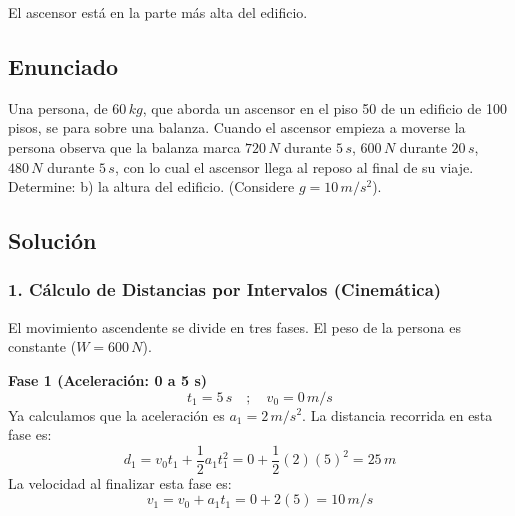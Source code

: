 \documentclass[12pt, a4paper]{article}
\begin{document}
\begin{tcolorbox}[colback=green!5!white, colframe=green!50!black, title=Respuesta Final]
\centering
El ascensor está en la parte más alta del edificio.
\end{tcolorbox}

\newpage

\subsection*{Enunciado}
Una persona, de $60 \, \si{kg}$, que aborda un ascensor en el piso 50 de un edificio de 100 pisos, se para sobre una balanza. Cuando el ascensor empieza a moverse la persona observa que la balanza marca $720 \, \si{N}$ durante $5 \, \si{s}$, $600 \, \si{N}$ durante $20 \, \si{s}$, $480 \, \si{N}$ durante $5 \, \si{s}$, con lo cual el ascensor llega al reposo al final de su viaje. Determine:
b) la altura del edificio. (Considere $g = 10 \, \si{m/s^2}$).

\begin{center}
\end{center}

\subsection*{Solución}

\subsubsection*{1. Cálculo de Distancias por Intervalos (Cinemática)}
El movimiento ascendente se divide en tres fases. El peso de la persona es constante ($W = 600 \, \si{N}$).

\textbf{Fase 1 (Aceleración: 0 a 5 s)}
$$ t_1 = 5 \, \si{s} \quad ; \quad v_0 = 0 \, \si{m/s} $$
Ya calculamos que la aceleración es $a_1 = 2 \, \si{m/s^2}$.
La distancia recorrida en esta fase es:
$$ d_1 = v_0 t_1 + \frac{1}{2} a_1 t_1^2 = 0 + \frac{1}{2} (2) (5)^2 = 25 \, \si{m} $$
La velocidad al finalizar esta fase es:
$$ v_1 = v_0 + a_1 t_1 = 0 + 2(5) = 10 \, \si{m/s} $$
\end{document}
